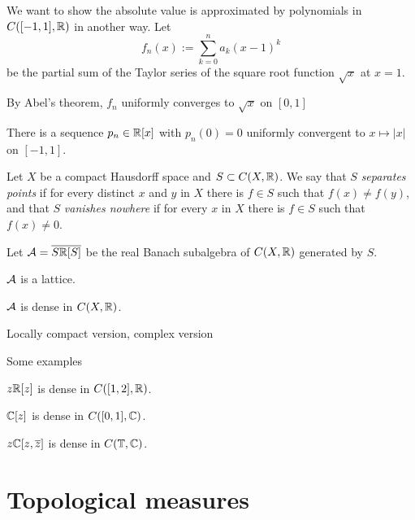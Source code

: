 \documentclass{../note}
\begin{document}
\begin{prb}
We want to show the absolute value is approximated by polynomials in $C([-1,1],\mathbb{R})$ in another way.
Let
\[f_n(x):=\sum_{k=0}^n a_k(x-1)^k\]
be the partial sum of the Taylor series of the square root function $\sqrt x$ at $x=1$.
\begin{parts}
\item By Abel's theorem, $f_n$ uniformly converges to $\sqrt x$ on $[0,1]$
\item There is a sequence $p_n\in\mathbb{R}[x]$ with $p_n(0)=0$ uniformly convergent to $x\mapsto|x|$ on $[-1,1]$.
\end{parts}
\end{prb}


\begin{prb}
Let $X$ be a compact Hausdorff space and $S\subset C(X,\mathbb{R})$.
We say that $S$ \emph{separates points} if for every distinct $x$ and $y$ in $X$ there is $f\in S$ such that $f(x)\ne f(y)$, and that $S$ \emph{vanishes nowhere} if for every $x$ in $X$ there is $f\in S$ such that $f(x)\ne0$.

Let $\mathcal{A}=\overline{S\mathbb{R}[S]}$ be the real Banach subalgebra of $C(X,\mathbb{R})$ generated by $S$.
\begin{parts}
\item $\mathcal{A}$ is a lattice.
\item $\mathcal{A}$ is dense in $C(X,\mathbb{R})$.
\end{parts}
\end{prb}




Locally compact version,
complex version








\begin{prb}
Some examples
\begin{parts}
\item $z\mathbb{R}[z]$ is dense in $C([1,2],\mathbb{R})$.
\item $\mathbb{C}[z]$ is dense in $C([0,1],\mathbb{C})$.
\item $z\mathbb{C}[z,\overline z]$ is dense in $C(\mathbb{T},\mathbb{C})$.
\end{parts}
\end{prb}












\chapter{Topological measures}
\end{document}
